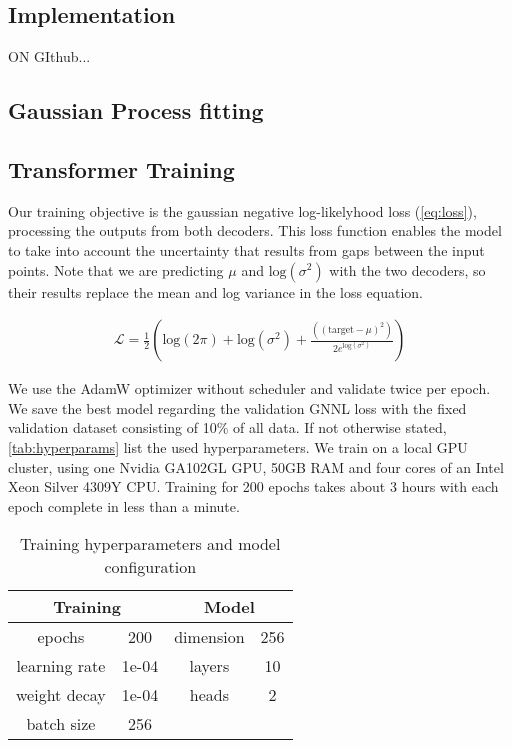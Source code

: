 \subsection{Implementation}
\label{ex:implementation}
ON GIthub...

\subsection{Gaussian Process fitting}

\subsection{Transformer Training}
\label{ex:training}
Our training objective is the gaussian negative log-likelyhood loss (\autoref{eq:loss}), processing the outputs from both decoders. This loss function enables the model to take into account the uncertainty that results from gaps between the input points. Note that we are predicting $\mu$ and $\text{log} (\sigma^2)$ with the two decoders, so their results replace the mean and log variance in the loss equation.

\begin{align}
\mathcal{L} = \frac{1}{2}\left(\text{log}(2\pi) + \text{log}(\sigma^2) + \frac{((\text{target} - \mu)^2)}{2 e^{\text{log}(\sigma^2)}}\right) \label{eq:loss}
\end{align}

We use the AdamW optimizer without scheduler and validate twice per epoch. We save the best model regarding the validation GNNL loss with the fixed validation dataset consisting of 10\% of all data. If not otherwise stated, \autoref{tab:hyperparams} list the used hyperparameters. We train on a local GPU cluster, using one Nvidia GA102GL GPU, 50GB RAM and four cores of an Intel Xeon Silver 4309Y CPU. Training for 200 epochs takes about 3 hours with each epoch complete in less than a minute.

\begin{table}[]
	\centering
	\caption{Training hyperparameters and model configuration}
	\begin{tabular}{c c c c}
		\toprule
		\multicolumn{2}{c}{Training} & \multicolumn{2}{c}{Model} \\
		\midrule
		epochs & 200 & dimension & 256 \\
		learning rate & 1e-04 & layers & 10\\
		weight decay & 1e-04 & heads & 2  \\
		batch size & 256 & \\\bottomrule
	\end{tabular}
	\label{tab:hyperparams}
\end{table}

